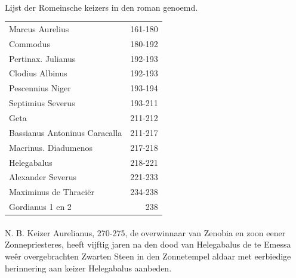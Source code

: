 \documentclass[a4paper, 12pt, oneside, dutch]{article}
\begin{document}
\paragraph{}
Lijst der Romeinsche keizers in den roman genoemd.  
\begin{table}[h]
    \centering
    \Fontauri
    \begin{tabular}{l r}
         Marcus Aurelius	& 161-180 \\
        Commodus & 180-192 \\
        Pertinax. Julianus & 192-193 \\
        Clodius Albinus	& 192-193 \\
        Pescennius Niger & 193-194 \\
        Septimius Severus & 193-211 \\
        Geta & 211-212 \\
        Bassianus Antoninus Caracalla & 211-217 \\
        Macrinus. Diadumenos & 217-218 \\
        Helegabalus	& 218-221 \\
        Alexander Severus & 221-233 \\
        Maximinus de Thraciër & 234-238 \\
        Gordianus 1 en 2 & 238 \\
    \end{tabular}
\end{table}
\paragraph{}
N. B. Keizer Aurelianus, 270-275, de overwinnaar van Zenobia en zoon eener Zonnepriesteres, heeft vijftig jaren na den dood van Helegabalus de te Emessa weêr overgebrachten Zwarten Steen in den Zonnetempel aldaar met eerbiedige herinnering aan keizer Helegabalus aanbeden.
\clearpage
\end{document}
